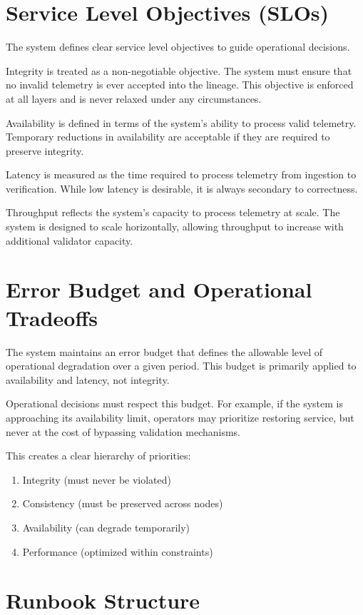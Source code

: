 \section{Service Level Objectives (SLOs)}

The system defines clear service level objectives to guide operational decisions.

Integrity is treated as a non-negotiable objective. The system must ensure that no invalid telemetry is ever accepted into the lineage. This objective is enforced at all layers and is never relaxed under any circumstances.

Availability is defined in terms of the system’s ability to process valid telemetry. Temporary reductions in availability are acceptable if they are required to preserve integrity.

Latency is measured as the time required to process telemetry from ingestion to verification. While low latency is desirable, it is always secondary to correctness.

Throughput reflects the system’s capacity to process telemetry at scale. The system is designed to scale horizontally, allowing throughput to increase with additional validator capacity.

\section{Error Budget and Operational Tradeoffs}

The system maintains an error budget that defines the allowable level of operational degradation over a given period. This budget is primarily applied to availability and latency, not integrity.

Operational decisions must respect this budget. For example, if the system is approaching its availability limit, operators may prioritize restoring service, but never at the cost of bypassing validation mechanisms.

This creates a clear hierarchy of priorities:
\begin{enumerate}
\item Integrity (must never be violated)
\item Consistency (must be preserved across nodes)
\item Availability (can degrade temporarily)
\item Performance (optimized within constraints)
\end{enumerate}

\section{Runbook Structure}


